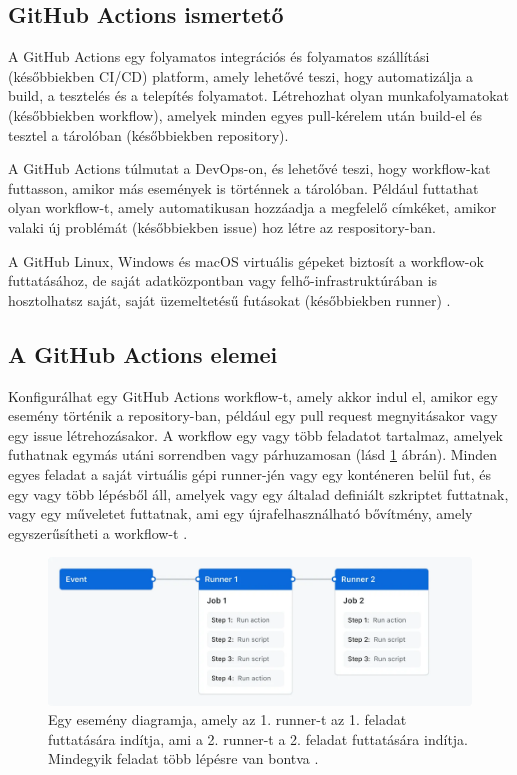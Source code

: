 \subsection{GitHub Actions ismertető}
A GitHub Actions egy folyamatos integrációs és folyamatos szállítási (későbbiekben CI/CD) platform, amely lehetővé teszi, hogy automatizálja a build, a tesztelés és a telepítés folyamatot.
Létrehozhat olyan munkafolyamatokat (későbbiekben workflow), amelyek minden egyes pull-kérelem után build-el és tesztel a tárolóban (későbbiekben repository).

A GitHub Actions túlmutat a DevOps-on, és lehetővé teszi, hogy workflow-kat futtasson, amikor más események is történnek a tárolóban.
Például futtathat olyan workflow-t, amely automatikusan hozzáadja a megfelelő címkéket, amikor valaki új problémát (későbbiekben issue) hoz létre az respository-ban.

A GitHub Linux, Windows és macOS virtuális gépeket biztosít a workflow-ok futtatásához, de saját adatközpontban vagy felhő-infrastruktúrában is hosztolhatsz saját, saját üzemeltetésű futásokat (későbbiekben runner) \cite{github}.

\subsection{A GitHub Actions elemei}
Konfigurálhat egy GitHub Actions workflow-t, amely akkor indul el, amikor egy esemény történik a repository-ban, például egy pull request megnyitásakor vagy egy issue létrehozásakor.
A workflow egy vagy több feladatot tartalmaz, amelyek futhatnak egymás utáni sorrendben vagy párhuzamosan (lásd \ref{overview-actions-simple} ábrán).
Minden egyes feladat a saját virtuális gépi runner-jén vagy egy konténeren belül fut, és egy vagy több lépésből áll, amelyek vagy egy általad definiált szkriptet futtatnak, vagy egy műveletet futtatnak, ami egy újrafelhasználható bővítmény, amely egyszerűsítheti a workflow-t \cite{github}.

\begin{figure}[ht]
    \centering
         \includegraphics[width=1.0\textwidth]{figures/github/overview-actions-simple.png}
          \caption{Egy esemény diagramja, amely az 1. runner-t az 1. feladat futtatására indítja, ami a 2. runner-t a 2. feladat futtatására indítja. Mindegyik feladat több lépésre van bontva \cite{github}.}
           \label{overview-actions-simple}
\end{figure}

